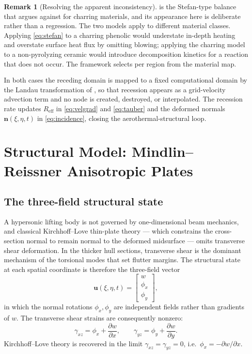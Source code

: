 \documentclass[11pt,a4paper]{article}
\theoremstyle{definition}
\newtheorem{remark}[theorem]{Remark}
\numberwithin{equation}{section}
\begin{document}
\begin{remark}[Resolving the apparent inconsistency]
\label{rem:stefan}
 is the Stefan-type balance that \cite{knox2026passes} argues against for charring materials, and its appearance here is deliberate rather than a regression. The two models apply to different material classes. Applying \cref{eq:stefan} to a charring phenolic would understate in-depth heating and overstate surface heat flux by omitting blowing; applying the charring model to a non-pyrolyzing ceramic would introduce decomposition kinetics for a reaction that does not occur. The framework selects per region from the material map.
\end{remark}

In both cases the receding domain is mapped to a fixed computational domain by the Landau transformation of \cite{knox2026passes}, so that recession appears as a grid-velocity advection term and no node is created, destroyed, or interpolated. The recession rate updates $R_{\text{eff}}$ in \cref{eq:velgrad} and \cref{eq:tauber} and the deformed normals $\mathbf{n}(\xi,\eta,t)$ in \cref{eq:incidence}, closing the aerothermal-structural loop.

\section{Structural Model: Mindlin--Reissner Anisotropic Plates}
\label{sec:structural}

\subsection{The three-field structural state}
\label{sec:threefield}

A hypersonic lifting body is not governed by one-dimensional beam mechanics, and classical Kirchhoff--Love thin-plate theory --- which constrains the cross-section normal to remain normal to the deformed midsurface --- omits transverse shear deformation. In the thicker hull sections, transverse shear is the dominant mechanism of the torsional modes that set flutter margins. The structural state at each spatial coordinate is therefore the three-field vector
\begin{equation}
\label{eq:ustate}
\mathbf{u}(\xi,\eta,t) = \begin{bmatrix} w \\ \phi_x \\ \phi_y \end{bmatrix},
\end{equation}
in which the normal rotations $\phi_x, \phi_y$ are independent fields rather than gradients of $w$. The transverse shear strains are consequently nonzero:
\begin{equation}
\label{eq:shearstrain}
\gamma_{xz} = \phi_x + \frac{\partial w}{\partial x},
\qquad
\gamma_{yz} = \phi_y + \frac{\partial w}{\partial y} .
\end{equation}
Kirchhoff--Love theory is recovered in the limit $\gamma_{xz} = \gamma_{yz} = 0$, i.e.\ $\phi_x = -\partial w/\partial x$.
\end{document}
